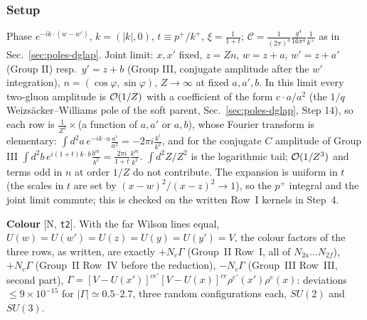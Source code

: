 \documentclass[10pt]{article}
\begin{document}
\subsubsection{Setup}
\noindent Phase $e^{-ik\cdot(w-w')}$, $k=(|k|,0)$, $t\equiv p^{+}/k^{+}$, $\xi=\frac{1}{1+t}$; $\mathcal{C}=\frac{1}{(2\pi)^{3}}\frac{g^{4}}{16\pi^{4}}\frac{1}{k^{+}}$ as in Sec.~\ref{sec:poles-dglap}. Joint limit: $x,x'$ fixed, $z=Zn$, $w=z+a$, $w'=z+a'$ (Group II) resp.\ $y'=z+b$ (Group III, conjugate amplitude after the $w'$ integration), $n=(\cos\varphi,\sin\varphi)$, $Z\to\infty$ at fixed $a,a',b$. In this limit every two-gluon amplitude is ${\cal O}(1/Z)$ with a coefficient of the form $c\cdot a/a^{2}$ (the $1/q$ Weizs\"acker--Williams pole of the soft parent, Sec.~\ref{sec:poles-dglap}, Step 14), so each row is $\frac{1}{Z^{2}}\times$(a function of $a,a'$ or $a,b$), whose Fourier transform is elementary: $\int d^{2}a\,e^{-ik\cdot a}\frac{a^{i}}{a^{2}}=-2\pi i\frac{k^{i}}{k^{2}}$, and for the conjugate $C$ amplitude of Group III $\int d^{2}b\,e^{i(1+t)k\cdot b}\frac{b^{m}}{b^{2}}=\frac{2\pi i}{1+t}\frac{k^{m}}{k^{2}}$. $\int d^{2}Z/Z^{2}$ is the logarithmic tail; ${\cal O}(1/Z^{3})$ and terms odd in $n$ at order $1/Z$ do not contribute. The expansion is uniform in $t$ (the scales in $t$ are set by $(x-w)^{2}/(x-z)^{2}\to1$), so the $p^{+}$ integral and the joint limit commute; this is checked on the written Row~I kernels in Step~4.

\noindent\textbf{Colour} [N, \texttt{t2}]. With the far Wilson lines equal, $U(w)=U(w')=U(z)=U(y)=U(y')=V$, the colour factors of the three rows, as written, are exactly $+N_{c}\Gamma$ (Group~II Row~I, all of $N_{2a}\dots N_{2f}$), $+N_{c}\Gamma$ (Group~II Row~IV before the reduction), $-N_{c}\Gamma$ (Group~III Row~III, second part), $\Gamma=[V-U(x')]^{ce'}[V-U(x)]^{ce}\rho^{e'}(x')\rho^{e}(x)$: deviations $\le9\times10^{-15}$ for $|\Gamma|\simeq0.5$--$2.7$, three random configurations each, $SU(2)$ and $SU(3)$.
\end{document}
